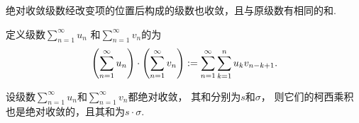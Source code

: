 \begin{property}[绝对收敛级数的可交换性]\label{theorem:无穷级数.绝对收敛级数的可交换性}
绝对收敛级数经改变项的位置后构成的级数也收敛，且与原级数有相同的和.
\end{property}

\begin{definition}\label{definition:无穷级数.绝对收敛级数的柯西乘积}
定义级数\(\sum_{n=1}^\infty u_n\)
和\(\sum_{n=1}^\infty v_n\)的为\[
	\left( \sum_{n=1}^\infty u_n \right)
	\cdot
	\left( \sum_{n=1}^\infty v_n \right)
	:=
	\sum_{n=1}^\infty \sum_{k=1}^n u_k v_{n-k+1}.
\]
\end{definition}

\begin{theorem}\label{theorem:无穷级数.绝对收敛级数的柯西乘积必收敛}
设级数\(\sum_{n=1}^\infty u_n\)和\(\sum_{n=1}^\infty v_n\)都绝对收敛，
其和分别为\(s\)和\(\sigma\)，
则它们的柯西乘积也是绝对收敛的，且其和为\(s \cdot \sigma\).
\end{theorem}

